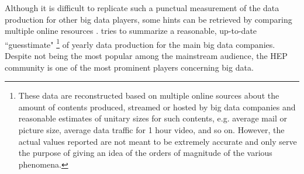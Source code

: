 Although it is difficult to replicate such a punctual measurement of the data production for other big data players, some hints can be retrieved by comparing multiple online resources \cite{clissa2022survey}. %
 tries to summarize a reasonable, up-to-date ``guesstimate"%
\footnote{These data are reconstructed based on multiple online sources about the amount of contents produced, streamed or hosted by big data companies and reasonable estimates of unitary sizes for such contents, e.g. average mail or picture size, average data traffic for 1 hour video, and so on. 
However, the actual values reported are not meant to be extremely accurate and only serve the purpose of giving an idea of the orders of magnitude of the various phenomena.
}
of yearly data production for the main big data companies.
Despite not being the most popular among the mainstream audience, the HEP community is one of the most prominent players concerning big data.

